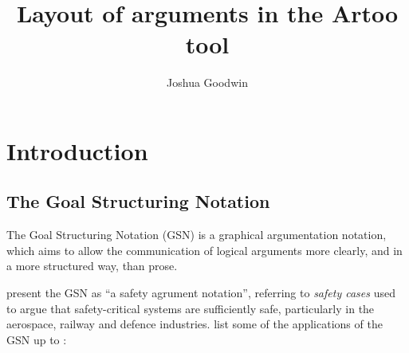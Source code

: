 \documentclass[authoryearcitations]{UoYCSproject}
\author{Joshua Goodwin}
\title{Layout of arguments in the Artoo tool}
\begin{document}
\maketitle




\chapter{Introduction}

\section{The Goal Structuring Notation}

The Goal Structuring Notation (GSN) is a graphical argumentation notation,
which aims to allow the communication of logical arguments more clearly, and in a more structured way, than prose.

\citet{kelly2004goal} present the GSN as ``a safety agrument notation'',
referring to \emph{safety cases} used to argue that safety-critical systems are sufficiently safe,
particularly in the aerospace, railway and defence industries.
\citet{Habli:2006:PPC:1183088.1183090} list some of the applications of the GSN up to \citeyear{Habli:2006:PPC:1183088.1183090}:
\end{document}
